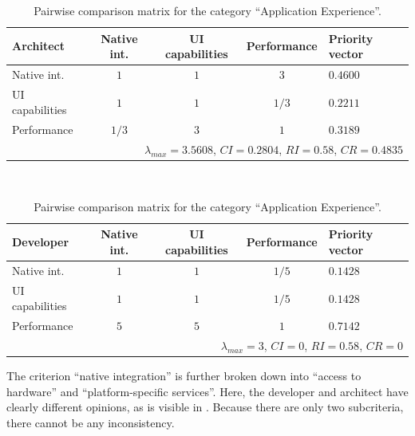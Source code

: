\begin{table}[h!]
    \centering
    \begin{tabular}{lcccl}
        \hline
        \textbf{Architect}     & Native int. & UI capabilities & Performance & Priority vector \\ 
        \hline
        Native int.            & $1$         & $1$             & $3$         & $0.4600$        \\
        UI capabilities        & $1$         & $1$             & $1/3$       & $0.2211$        \\
        Performance            & $1/3$       & $3$             & $1$         & $0.3189$        \\
        \hline
        \multicolumn{5}{r}{$\lambda_{max} = 3.5608$, $CI = 0.2804$, $RI = 0.58$, $CR = 0.4835$}\\
        \hline
    \end{tabular}
    \\\vspace{1em}
    \begin{tabular}{lcccl}
        \hline
        \textbf{Developer}     & Native int. & UI capabilities & Performance & Priority vector \\ 
        \hline
        Native int.            & $1$         & $1$             & $1/5$       & $0.1428$        \\
        UI capabilities        & $1$         & $1$             & $1/5$       & $0.1428$        \\
        Performance            & $5$         & $5$             & $1$         & $0.7142$        \\
        \hline
        \multicolumn{5}{r}{$\lambda_{max} = 3$, $CI = 0$, $RI = 0.58$, $CR = 0$}               \\
        \hline
    \end{tabular}
    \caption{Pairwise comparison matrix for the category ``Application Experience''.}
    \label{tab:ae}
\end{table}

The criterion ``native integration'' is further broken down into ``access to hardware'' and ``platform-specific services''. Here, the developer and architect have clearly different opinions, as is visible in . Because there are only two subcriteria, there cannot be any inconsistency. 

